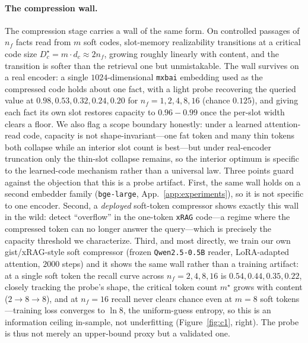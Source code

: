 \documentclass{article}
\newcommand{\dc}{d_c}
\begin{document}
\paragraph{The compression wall.} The compression stage carries a wall of the same form. On
controlled passages of $n_f$ facts read from $m$ soft codes, slot-memory realizability transitions
at a critical code size $D_c^\star=m\!\cdot\!\dc\approx 2 n_f$, growing roughly linearly with
content, and the transition is softer than the retrieval one but unmistakable. The wall survives on
a real encoder: a single $1024$-dimensional \texttt{mxbai} embedding used as the compressed code
holds about one fact, with a light probe recovering the queried value at $0.98,0.53,0.32,0.24,0.20$
for $n_f=1,2,4,8,16$ (chance $0.125$), and giving each fact its own slot restores capacity to
$0.96\!-\!0.99$ once the per-slot width clears a floor. We also flag a scope boundary honestly:
under a learned attention-read code, capacity is not shape-invariant---one fat token and many thin
tokens both collapse while an interior slot count is best---but under real-encoder truncation only
the thin-slot collapse remains, so the interior optimum is specific to the learned-code mechanism
rather than a universal law. Three points guard against the objection that this is a probe artifact.
First, the same wall holds on a second embedder family (\texttt{bge-large}, App.~\ref{app:experiments}),
so it is not specific to one encoder. Second, a \emph{deployed} soft-token compressor shows exactly
this wall in the wild: \citet{belikova2026overflow} detect ``overflow'' in the one-token
\texttt{xRAG} \citep{cheng2024xrag} code---a regime where the compressed token can no longer answer
the query---which is precisely the capacity threshold we characterize. Third, and most directly, we
train our own gist/xRAG-style soft compressor (frozen \texttt{Qwen2.5-0.5B} reader, LoRA-adapted
attention, $2000$ steps) and it shows the same wall rather than a training artifact: at a single
soft token the recall curve across $n_f{=}2,4,8,16$ is $0.54,0.44,0.35,0.22$, closely tracking the
probe's shape, the critical token count $m^\star$ grows with content ($2{\to}8{\to}8$), and at
$n_f{=}16$ recall never clears chance even at $m{=}8$ soft tokens---training loss converges to
$\ln 8$, the uniform-guess entropy, so this is an information ceiling in-sample, not underfitting
(Figure~\ref{fig:c1}, right). The probe is thus not merely an upper-bound proxy but a validated one.
\end{document}
